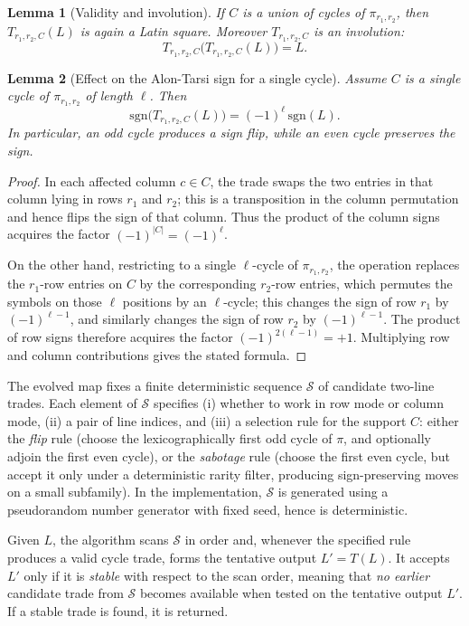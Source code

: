 \documentclass[11pt]{amsart}
\newtheorem{lemma}{Lemma}
\newcommand{\sgn}{\mathrm{sgn}}
\begin{document}
\begin{lemma}[Validity and involution]
If $C$ is a union of cycles of $\pi_{r_1,r_2}$, then $T_{r_1,r_2,C}(L)$ is again a Latin square.
Moreover $T_{r_1,r_2,C}$ is an involution:
\[
T_{r_1,r_2,C}\bigl(T_{r_1,r_2,C}(L)\bigr)=L.
\]
\end{lemma}

\begin{lemma}[Effect on the Alon-Tarsi sign for a single cycle]
Assume $C$ is a single cycle of $\pi_{r_1,r_2}$ of length $\ell$.
Then
\[
\sgn\bigl(T_{r_1,r_2,C}(L)\bigr)=(-1)^{\ell}\,\sgn(L).
\]
In particular, an odd cycle produces a sign flip, while an even cycle preserves the sign.
\end{lemma}

\begin{proof}
In each affected column $c\in C$, the trade swaps the two entries in that column lying in rows $r_1$ and $r_2$; this is a transposition in the column permutation and hence flips the sign of that column.  Thus the product of the column signs acquires the factor $(-1)^{|C|}=(-1)^{\ell}$.

On the other hand, restricting to a single $\ell$-cycle of $\pi_{r_1,r_2}$, the operation replaces the $r_1$-row entries on $C$ by the corresponding $r_2$-row entries, which permutes the symbols on those $\ell$ positions by an $\ell$-cycle; this changes the sign of row $r_1$ by $(-1)^{\ell-1}$, and similarly changes the sign of row $r_2$ by $(-1)^{\ell-1}$.  The product of row signs therefore acquires the factor $(-1)^{2(\ell-1)}=+1$.  Multiplying row and column contributions gives the stated formula.
\end{proof}

The evolved map fixes a finite deterministic sequence $\mathcal{S}$ of candidate two-line trades.
Each element of $\mathcal{S}$ specifies (i) whether to work in row mode or column mode, (ii) a pair of line indices, and (iii) a selection rule for the support $C$:
either the \emph{flip} rule (choose the lexicographically first odd cycle of $\pi$, and optionally adjoin the first even cycle), or the \emph{sabotage} rule (choose the first even cycle, but accept it only under a deterministic rarity filter, producing sign-preserving moves on a small subfamily).
In the implementation, $\mathcal{S}$ is generated using a pseudorandom number generator with fixed seed, hence is deterministic.

Given $L$, the algorithm scans $\mathcal{S}$ in order and, whenever the specified rule produces a valid cycle trade, forms the tentative output $L'=T(L)$.
It accepts $L'$ only if it is \emph{stable} with respect to the scan order, meaning that \emph{no earlier} candidate trade from $\mathcal{S}$ becomes available when tested on the tentative output $L'$.
If a stable trade is found, it is returned.
\end{document}
